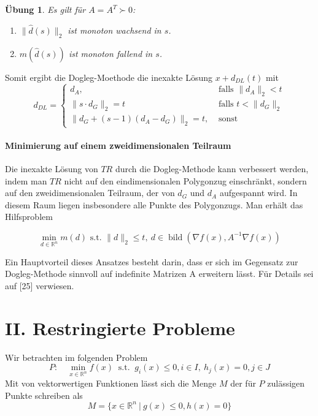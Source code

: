 \documentclass[11pt]{scrreprt}
\newcounter{thm}
\theoremstyle{thmstyle}
\numberwithin{thm}{section}
\newtheorem{uebung}[thm]{Übung}
\begin{document}
\begin{uebung}
	Es gilt für $A = A^T \succ 0$:
	\begin{enumerate}[label=\alph*\upshape)]
		\item $\|\hat{d}(s)\|_2$ ist monoton wachsend in $s$.
		\item $m(\hat{d}(s))$ ist monoton fallend in $s$.
	\end{enumerate}
\end{uebung}

Somit ergibt die Dogleg-Moethode die inexakte Lösung $x + d_{DL}(t)$ mit
$$ d_{DL} = \begin{cases}
 d_A, & \text{ falls } \| d_A \|_2 < t \\ \| s \cdot d_G \|_2 = t & \text{ falls } t < \| d_G \|_2 \\ \| d_G + (s - 1) (d_A - d_G) \|_2= t, & \text{ sonst}	
 \end{cases}
 $$
 
 \subsubsection*{Minimierung auf einem zweidimensionalen Teilraum}

Die inexakte Lösung von $TR$ durch die Dogleg-Methode kann verbessert werden, indem man $TR$ nicht auf den eindimensionalen Polygonzug einschränkt, sondern auf den zweidimensionalen Teilraum, der von $d_G$ und $d_A$ aufgespannt wird. In diesem Raum liegen insbesondere alle Punkte des Polygonzugs. Man erhält das Hilfsproblem

$$ \min_{d \in \mathbb{R}^n} m(d) \text{ s.t. } \| d \|_2 \leq t, ~ d \in \operatorname{bild}(\nabla f(x), A^{-1} \nabla f(x)) $$

Ein Hauptvorteil dieses Ansatzes besteht darin, dass er sich im Gegensatz zur Dogleg-Methode sinnvoll auf indefinite Matrizen A erweitern lässt. Für Details sei auf [25] verwiesen.

\chapter*{II. Restringierte Probleme}

\setcounter{chapter}{3}
\setcounter{section}{1}
\setcounter{thm}{0}

Wir betrachten im folgenden Problem
$$ P: \quad \min_{x \in \mathbb{R}^n} f(x) ~\text{ s.t. }~ g_i(x) \leq 0, i \in I, ~ h_j(x) = 0, j \in J $$
Mit von vektorwertigen Funktionen lässt sich die Menge $M$ der für $P$ zulässigen Punkte schreiben als
$$ M = \big\{ x \in \mathbb{R}^n ~|~ g(x) \leq 0, h(x) = 0 \big\} $$
\end{document}
